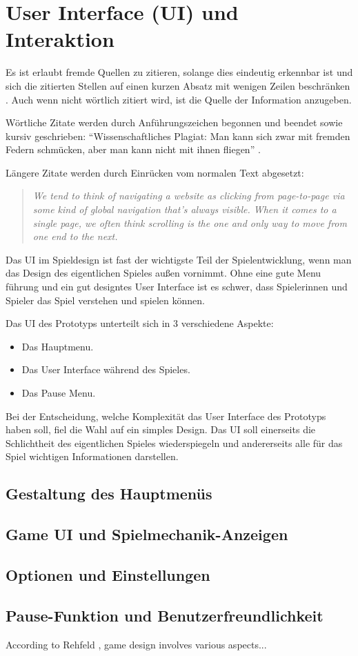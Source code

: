 \chapter{User Interface (UI) und Interaktion}

Es ist erlaubt fremde Quellen zu zitieren, solange dies eindeutig erkennbar ist und sich die zitierten Stellen auf einen kurzen Absatz mit wenigen Zeilen beschränken \parencite[vgl.][S. 10]{quelle1}. Auch wenn nicht wörtlich zitiert wird, ist die Quelle der Information anzugeben.

Wörtliche Zitate werden durch Anführungszeichen begonnen und beendet sowie kursiv geschrieben: \enquote{Wissenschaftliches Plagiat: Man kann sich zwar mit fremden Federn schmücken, aber man kann nicht mit ihnen fliegen} \parencite[S. 15]{quelle3}.

Längere Zitate werden durch Einrücken vom normalen Text abgesetzt:

\begin{quote}
\textit{We tend to think of navigating a website as clicking from page-to-page via some kind of global navigation that's always visible. When it comes to a single page, we often think scrolling is the one and only way to move from one end to the next.} \parencite[vgl.][S. 10]{rehfeld}
\end{quote}

Das UI im Spieldesign ist fast der wichtigste Teil der Spielentwicklung, wenn man das Design des eigentlichen Spieles außen vornimmt. 
Ohne eine gute Menu führung und ein gut designtes User Interface ist es schwer, dass Spielerinnen und Spieler das Spiel verstehen und spielen können. 
\linebreak

Das UI des Prototyps unterteilt sich in 3 verschiedene Aspekte:

\begin{itemize}
    \item Das Hauptmenu.
    \item Das User Interface während des Spieles.
    \item Das Pause Menu.
\end{itemize}

\noindent
Bei der Entscheidung, welche Komplexität das User Interface des Prototyps haben soll, fiel die Wahl auf ein simples Design. 
Das UI soll einerseits die Schlichtheit des eigentlichen Spieles wiederspiegeln und andererseits alle für das Spiel wichtigen Informationen darstellen.

\section{Gestaltung des Hauptmenüs}
\section{Game UI und Spielmechanik-Anzeigen}
\section{Optionen und Einstellungen}
\section{Pause-Funktion und Benutzerfreundlichkeit}

According to Rehfeld \cite{rehfeld}, game design involves various aspects...
